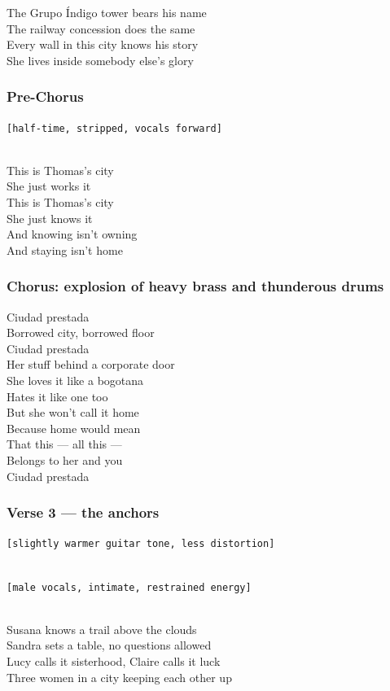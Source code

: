 The Grupo Índigo tower bears his name\\
The railway concession does the same\\
Every wall in this city knows his story\\
She lives inside somebody else's glory

\subsubsection{Pre-Chorus}\label{pre-chorus-60}

\texttt{{[}half-time,\ stripped,\ vocals\ forward{]}}\strut \\
This is Thomas's city\\
She just works it\\
This is Thomas's city\\
She just knows it\\
And knowing isn't owning\\
And staying isn't home

\subsubsection{Chorus: explosion of heavy brass and thunderous
drums}\label{chorus-explosion-of-heavy-brass-and-thunderous-drums}

Ciudad prestada\\
Borrowed city, borrowed floor\\
Ciudad prestada\\
Her stuff behind a corporate door\\
She loves it like a bogotana\\
Hates it like one too\\
But she won't call it home\\
Because home would mean\\
That this --- all this ---\\
Belongs to her and you\\
Ciudad prestada

\subsubsection{Verse 3 --- the anchors}\label{verse-3-the-anchors}

\texttt{{[}slightly\ warmer\ guitar\ tone,\ less\ distortion{]}}\strut \\
\texttt{{[}male\ vocals,\ intimate,\ restrained\ energy{]}}\strut \\
Susana knows a trail above the clouds\\
Sandra sets a table, no questions allowed\\
Lucy calls it sisterhood, Claire calls it luck\\
Three women in a city keeping each other up

